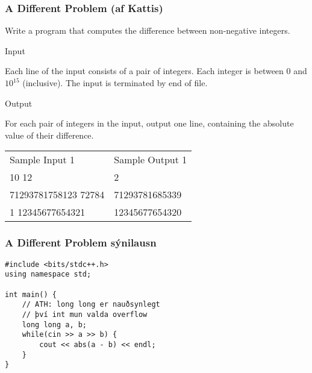 \documentclass{beamer}
\begin{document}
\begin{frame}
\frametitle{A Different Problem (af Kattis)}
Write a program that computes the difference between non-negative integers. \\
\begin{large}
Input \\
\end{large}
Each line of the input consists of a pair of integers. Each integer is between $0$
and $10^{15}$ (inclusive). The input is terminated by end of file. \\
\begin{large}
Output \\
\end{large}
For each pair of integers in the input, output one line, containing the absolute value of their difference. \\

\begin{tabular}{ll}
Sample Input 1 & Sample Output 1 \\
10 12 & 2 \\
71293781758123 72784 & 71293781685339 \\
1 12345677654321 & 12345677654320 \\
\end{tabular}

\end{frame}

\begin{frame}[fragile]
\frametitle{A Different Problem sýnilausn}

\begin{verbatim}
#include <bits/stdc++.h>
using namespace std;

int main() {
    // ATH: long long er nauðsynlegt 
    // því int mun valda overflow
    long long a, b;
    while(cin >> a >> b) {
        cout << abs(a - b) << endl;
    }
}
\end{verbatim}

\end{frame}
\end{document}
